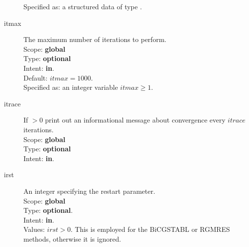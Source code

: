 \begin{description}
Specified as: a structured data of type \descdata.
\item[itmax]  The maximum number of iterations to perform.\\
Scope: {\bf global} \\
Type: {\bf optional}\\
Intent: {\bf in}.\\
Default: $itmax = 1000$.\\
Specified as: an integer variable $itmax \ge 1$.
\item[itrace] If $>0$  print out an informational message about
  convergence  every $itrace$ iterations.\\ 
Scope: {\bf global} \\
Type: {\bf optional}\\
Intent: {\bf in}.\\
\item[irst]  An integer specifying the restart parameter.\\
Scope: {\bf global} \\
Type: {\bf optional}.\\
Intent: {\bf in}.\\
Values: $irst>0$. This is employed for the BiCGSTABL or RGMRES
methods, otherwise it is ignored. 


\end{description}

